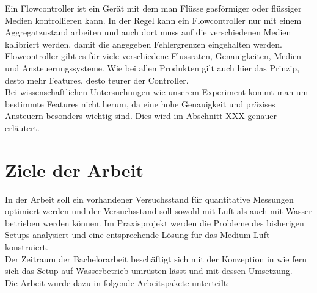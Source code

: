 Ein Flowcontroller ist ein Gerät mit dem man Flüsse gasförmiger oder flüssiger Medien kontrollieren kann. In der Regel kann ein Flowcontroller nur mit einem Aggregatzustand arbeiten und auch dort muss auf die verschiedenen Medien kalibriert werden, damit die angegeben Fehlergrenzen eingehalten werden. \\
Flowcontroller gibt es für viele verschiedene Flussraten, Genauigkeiten, Medien und Ansteuerungssysteme. Wie bei allen Produkten gilt auch hier das Prinzip, desto mehr Features, desto teurer der Controller. \\
Bei wissenschaftlichen Untersuchungen wie unserem Experiment kommt man um bestimmte Features nicht herum, da eine hohe Genauigkeit und präzises Ansteuern besonders wichtig sind. Dies wird im Abschnitt XXX genauer erläutert.



\section{Ziele der Arbeit}

In der Arbeit soll ein vorhandener Versuchsstand für quantitative Messungen optimiert werden und der Versuchsstand soll sowohl mit Luft als auch mit Wasser betrieben werden können. Im Praxisprojekt werden die Probleme des bisherigen Setups analysiert und eine entsprechende Lösung für das Medium Luft konstruiert. \\ 
Der Zeitraum der Bachelorarbeit beschäftigt sich mit der Konzeption in wie fern sich das Setup auf Wasserbetrieb umrüsten lässt und mit dessen Umsetzung. \\
Die Arbeit wurde dazu in folgende Arbeitspakete unterteilt:


























